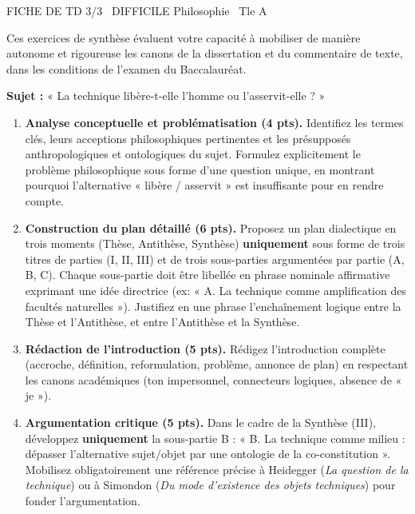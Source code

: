 \documentclass[11pt]{article}
\begin{document}
\begin{tcolorbox}[enhanced,colback=popink,colframe=popink,arc=10pt,boxrule=0pt,left=12pt,right=12pt,top=9pt,bottom=9pt]
{\color{white}\popxbold\small FICHE DE TD 3/3 \textbullet\ DIFFICILE \hfill Philosophie \textbullet\ Tle A\par}
\end{tcolorbox}
\vspace{4pt}
Ces exercices de synthèse évaluent votre capacité à mobiliser de manière autonome et rigoureuse les canons de la dissertation et du commentaire de texte, dans les conditions de l'examen du Baccalauréat.

\begin{exercice}
\textbf{Sujet :} « La technique libère-t-elle l'homme ou l'asservit-elle ? »

\begin{enumerate}
    \item \textbf{Analyse conceptuelle et problématisation (4 pts).} Identifiez les termes clés, leurs acceptions philosophiques pertinentes et les présupposés anthropologiques et ontologiques du sujet. Formulez explicitement le problème philosophique sous forme d'une question unique, en montrant pourquoi l'alternative « libère / asservit » est insuffisante pour en rendre compte.
    \item \textbf{Construction du plan détaillé (6 pts).} Proposez un plan dialectique en trois moments (Thèse, Antithèse, Synthèse) \textbf{uniquement} sous forme de trois titres de parties (I, II, III) et de trois sous-parties argumentées par partie (A, B, C). Chaque sous-partie doit être libellée en phrase nominale affirmative exprimant une idée directrice (ex: « A. La technique comme amplification des facultés naturelles »). Justifiez en une phrase l'enchaînement logique entre la Thèse et l'Antithèse, et entre l'Antithèse et la Synthèse.
    \item \textbf{Rédaction de l'introduction (5 pts).} Rédigez l'introduction complète (accroche, définition, reformulation, problème, annonce de plan) en respectant les canons académiques (ton impersonnel, connecteurs logiques, absence de « je »).
    \item \textbf{Argumentation critique (5 pts).} Dans le cadre de la Synthèse (III), développez \textbf{uniquement} la sous-partie B : « B. La technique comme milieu : dépasser l'alternative sujet/objet par une ontologie de la co-constitution ». Mobilisez obligatoirement une référence précise à Heidegger (\textit{La question de la technique}) ou à Simondon (\textit{Du mode d'existence des objets techniques}) pour fonder l'argumentation.
\end{enumerate}
\end{exercice}
\end{document}
